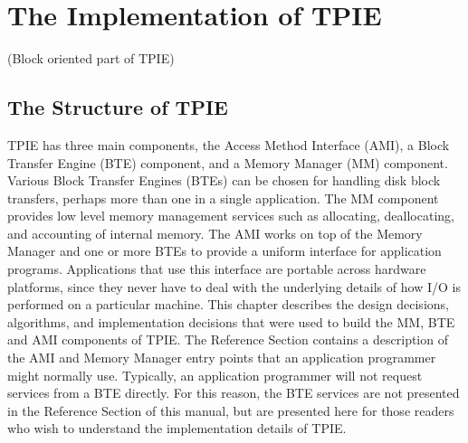 
\chapter{The Implementation of TPIE}

\tobewritten(Block oriented part of TPIE)

\section{The Structure of TPIE}
 

TPIE has three main components, the Access Method Interface
(AMI), a Block Transfer Engine
(BTE) component, and a Memory Manager
(MM) component. Various Block Transfer Engines
(BTEs) can be chosen for handling disk block transfers, perhaps more
than one in a single application.  The MM
component provides low level memory management services such as
allocating, deallocating, and accounting of internal memory. The AMI
works on top of the Memory Manager and one or more BTEs to provide a
uniform interface for application programs. Applications that use this
interface are portable across hardware platforms, since they never
have to deal with the underlying details of how I/O is performed on a
particular machine. This chapter describes the design decisions,
algorithms, and implementation decisions that were used to build the
MM, BTE and AMI components of TPIE. The Reference Section contains a
description of the AMI and Memory Manager entry points that an
application programmer might normally use. Typically, an application
programmer will not request services from a BTE directly. For this
reason, the BTE services are not presented in the Reference Section of
this manual, but are presented here for those readers who wish to
understand the implementation details of TPIE.


